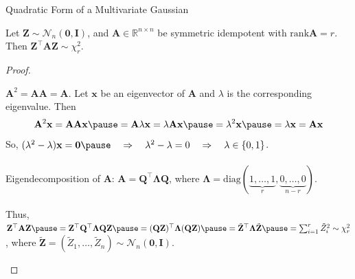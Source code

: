 \documentclass{beamer}
\newcommand{\rank}{\mathrm{rank}}
\begin{document}
\begin{frame}{Quadratic Form of a Multivariate Gaussian}
\begin{theorem}
Let $\mathbf{Z}\sim\mathcal{N}_n(\mathbf{0},\mathbf{I})$, and $\mathbf{A}\in\mathbb{R}^{n\times n}$ be symmetric idempotent with $\rank\mathbf{A}=r$. Then
$\mathbf{Z}^\top\mathbf{A}\mathbf{Z}\sim\chi^2_r$.
\end{theorem}
\begin{proof}\begin{footnotesize}
\pause$\mathbf{A}^2=\mathbf{AA}=\mathbf{A}$. \pause Let $\mathbf{x}$ be an eigenvector of $\mathbf{A}$ and $\lambda$ is the corresponding eigenvalue. Then
$$
\mathbf{A}^2\mathbf{x}=\mathbf{AAx}\pause=\mathbf{A}\lambda\mathbf{x}=\lambda\mathbf{Ax}\pause=\lambda^2\mathbf{x}\pause=\lambda\mathbf{x}=\mathbf{Ax}
$$
\pause So, $(\lambda^2-\lambda)\mathbf{x}=\mathbf{0}\pause\quad\Rightarrow\quad\lambda^2-\lambda=0\quad\Rightarrow\quad\lambda\in\{0,1\}$.\\~\\

\pause Eigendecomposition of $\mathbf{A}$: \pause $\mathbf{A}=\mathbf{Q}^\top\boldsymbol\Lambda\mathbf{Q}$, \pause where $\boldsymbol\Lambda=\mathrm{diag}(\underbrace{1,\ldots,1}_{r},\underbrace{0,\ldots,0}_{n-r})$.\\~\\

Thus, $\mathbf{Z}^\top\mathbf{AZ}\pause=\mathbf{Z}^\top\mathbf{Q}^\top\boldsymbol\Lambda\mathbf{Q}\mathbf{Z}\pause=(\mathbf{QZ})^\top\boldsymbol\Lambda(\mathbf{QZ})\pause=\tilde{\mathbf{Z}}^\top\boldsymbol\Lambda\tilde{\mathbf{Z}}\pause=\sum_{i=1}^r\tilde{Z}_i^2\sim\chi^2_r$, \pause where $\tilde{\mathbf{Z}}=(\tilde{Z}_1,\ldots,\tilde{Z}_n)\sim\mathcal{N}_n(\mathbf{0},\mathbf{I})$.
\end{footnotesize}
\end{proof}
\end{frame}
\end{document}
